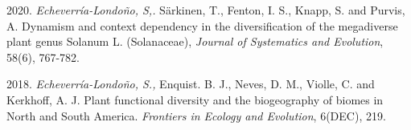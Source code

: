\documentclass[icon]{twentysecondcv}
\begin{document}
2020. \textit{Echeverr\'ia-Londo\~no, S,.}  S{\"a}rkinen, T., Fenton, I. S., Knapp, S. and Purvis, A. Dynamism and context dependency in the diversification of the megadiverse plant genus Solanum L. (Solanaceae), \textit{Journal of Systematics and Evolution},  58(6), 767-782. 

2018. \textit{Echeverr\'ia-Londo\~no, S.,} Enquist. B. J., Neves, D. M., Violle, C. and Kerkhoff, A. J. Plant functional diversity and the biogeography of biomes in North and South America. \textit{Frontiers in Ecology and Evolution}, 6(DEC), 219.



\end{document}
